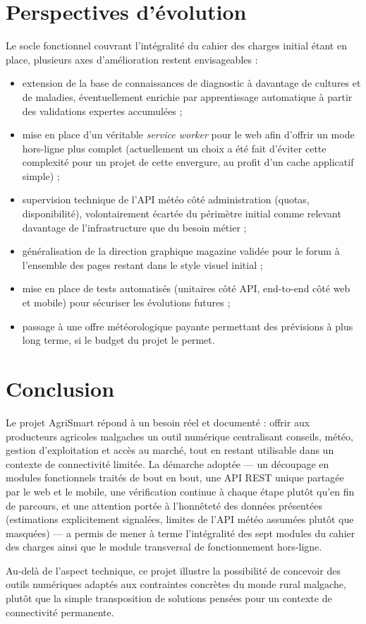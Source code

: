 \documentclass[12pt,a4paper]{report}
\begin{document}
\chapter{Perspectives d'évolution}
\label{chap:perspectives}

Le socle fonctionnel couvrant l'intégralité du cahier des charges initial étant en place, plusieurs axes d'amélioration restent envisageables :

\begin{itemize}
    \item extension de la base de connaissances de diagnostic à davantage de cultures et de maladies, éventuellement enrichie par apprentissage automatique à partir des validations expertes accumulées ;
    \item mise en place d'un véritable \emph{service worker} pour le web afin d'offrir un mode hors-ligne plus complet (actuellement un choix a été fait d'éviter cette complexité pour un projet de cette envergure, au profit d'un cache applicatif simple) ;
    \item supervision technique de l'API météo côté administration (quotas, disponibilité), volontairement écartée du périmètre initial comme relevant davantage de l'infrastructure que du besoin métier ;
    \item généralisation de la direction graphique \og magazine \fg{} validée pour le forum à l'ensemble des pages restant dans le style visuel initial ;
    \item mise en place de tests automatisés (unitaires côté API, end-to-end côté web et mobile) pour sécuriser les évolutions futures ;
    \item passage à une offre météorologique payante permettant des prévisions à plus long terme, si le budget du projet le permet.
\end{itemize}

\chapter{Conclusion}

Le projet AgriSmart répond à un besoin réel et documenté : offrir aux producteurs agricoles malgaches un outil numérique centralisant conseils, météo, gestion d'exploitation et accès au marché, tout en restant utilisable dans un contexte de connectivité limitée. La démarche adoptée --- un découpage en modules fonctionnels traités de bout en bout, une API REST unique partagée par le web et le mobile, une vérification continue à chaque étape plutôt qu'en fin de parcours, et une attention portée à l'honnêteté des données présentées (estimations explicitement signalées, limites de l'API météo assumées plutôt que masquées) --- a permis de mener à terme l'intégralité des sept modules du cahier des charges ainsi que le module transversal de fonctionnement hors-ligne.

Au-delà de l'aspect technique, ce projet illustre la possibilité de concevoir des outils numériques adaptés aux contraintes concrètes du monde rural malgache, plutôt que la simple transposition de solutions pensées pour un contexte de connectivité permanente.
\end{document}
